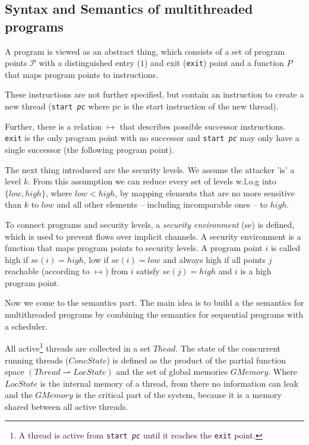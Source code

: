 \documentclass[a4paper,10pt]{llncs}
\begin{document}
\subsection{Syntax and Semantics of multithreaded programs}
\label{sec:syntaxsemantics}
A program is viewed as an abstract thing, which consists of a set of
program points $\mathcal{P}$ with a distinguished entry ($1$) and exit
(\texttt{exit}) point and a function $P$ that maps program points to
instructions.

These instructions are not further specified, but contain an instruction
to create a new thread (\texttt{start \textit{pc}} where pc is the start
instruction of the new thread).

Further, there is a relation $\mapsto$ that describes possible successor
instructions. \texttt{exit} is the only program point with no successor
and \texttt{start \textit{pc}} may only have a single successor (the
following program point).

The next thing introduced are the security levels. We assume the attacker
'is' a level $k$. From this assumption we can reduce every set of levels
w.l.o.g into $\{low, high\}$, where $low < high$, by mapping elements
that are no more sensitive than $k$ to $low$ and all other elements
-- including incomparable ones -- to $high$.

To connect programs and security levels, a \textit{security environment}
(se) is defined, which is used to prevent flows over implicit channels.
A security environment is a function that maps program points to security
levels. A program point $i$ is called high if $se(i) = high$, low if $se(i)
= low$ and always high if all points $j$ reachable (according to $\mapsto$)
from $i$ satisfy $se(j) = high$ and $i$ is a high program point.

Now we come to the semantics part. The main idea is to build a the semantics
for multithreaded programs by combining the semantics for sequential programs
with a scheduler.

All active\footnote{A thread is active from \texttt{start \textit{pc}} until
it reaches the \texttt{exit} point.} threads are collected in a set $Thead$.
The state of the concurrent running threads ($ConcState$) is defined as the
product of the partial function space $(Thread \rightharpoonup LocState)$
and the set of global memories $GMemory$. Where $LocState$ is the internal
memory of a thread, from there no information can leak and the $GMemory$ is
the critical part of the system, because it is a memory shared between all
active threads.
\end{document}
